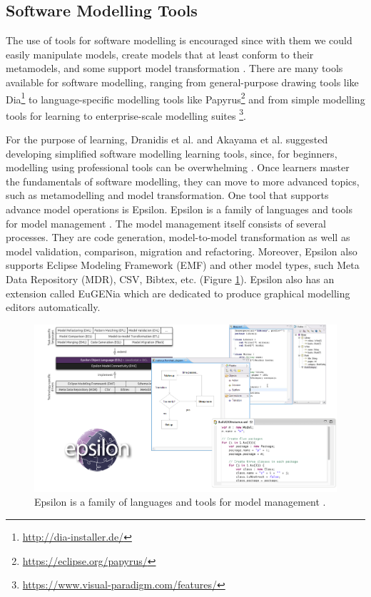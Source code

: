\documentclass[12pt, a4paper]{report}
\begin{document}
{\subsection{Software Modelling Tools}
The use of tools for software modelling is encouraged since with them we could easily manipulate models, create models that at least conform to their metamodels, and some support model transformation \cite{brambilla2012model}. There are many tools available for software modelling, ranging from general-purpose drawing tools like Dia\footnote{\url{http://dia-installer.de/}} to language-specific modelling tools like Papyrus\footnote{\url{https://eclipse.org/papyrus/}} and from  simple modelling tools for learning \cite{dranidis2015learning} to enterprise-scale modelling suites \footnote{\url{https://www.visual-paradigm.com/features/}}. 

For the purpose of learning, Dranidis et al. and Akayama et al. suggested developing simplified software modelling learning tools, since, for beginners, modelling using professional tools can be overwhelming \cite{dranidis2015learning, Akayama2013}. Once learners master the fundamentals of software modelling, they can move to more advanced topics, such as metamodelling and model transformation. One tool that supports advance model operations is Epsilon. Epsilon is a family of languages and tools for model management \cite{kolovos2010epsilon}. The model management itself consists of several processes. They are code generation, model-to-model transformation as well as model validation, comparison, migration and refactoring. Moreover, Epsilon also supports Eclipse Modeling Framework (EMF) and other model types, such Meta Data Repository (MDR), CSV, Bibtex, etc. (Figure \ref{epsilon}). Epsilon also has an extension called EuGENia which are dedicated to produce graphical modelling editors automatically\cite{kolovos2015eugenia}.


\begin{figure}[ht]
\centering
\includegraphics[width=\textwidth]{epsilon}
\caption{Epsilon is a family of languages and tools for model management \cite{kolovos2010epsilon}.}
\label{epsilon}
\end{figure}

}
\end{document}
